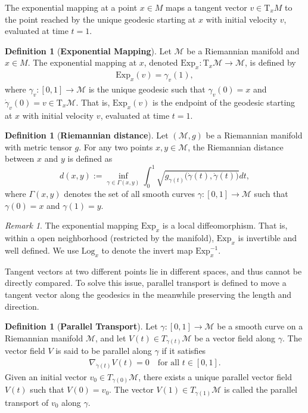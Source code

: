 \documentclass{article}
\theoremstyle{plain}
\theoremstyle{definition}
\newtheorem{definition}[theorem]{Definition}
\theoremstyle{remark}
\newtheorem{remark}[theorem]{Remark}
\begin{document}
The exponential mapping at a point $ x \in M $ maps a tangent vector $ v \in \mathrm{T}_x M $ to the point reached by the unique geodesic starting at $ x $ with initial velocity $ v $, evaluated at time $ t = 1 $. 

\begin{definition}[\bf Exponential Mapping]\label{def:exponential_mapping} 
Let $ \mathcal{M} $ be a Riemannian manifold and $ x \in M $. The exponential mapping at $ x $, denoted $ \mathrm{Exp}_x: \mathrm{T}_x \mathcal{M} \to \mathcal{M} $, is defined by
\begin{align*}
\mathrm{Exp}_x(v) = \gamma_v(1),
\end{align*}
where $ \gamma_v: [0,1] \to \mathcal{M} $ is the unique geodesic such that $ \gamma_v(0) = x $ and $ \dot{\gamma}_v(0) = v \in \mathrm{T}_x \mathcal{M} $. That is, $ \mathrm{Exp}_x(v) $ is the endpoint of the geodesic starting at $ x $ with initial velocity $ v $, evaluated at time $ t = 1 $.
\end{definition}

\begin{definition}[\bf Riemannian distance]
Let $(\mathcal{M}, g)$ be a Riemannian manifold with metric tensor $g$. 
For any two points $x,y \in \mathcal{M}$, the Riemannian distance between $x$ and $y$ is defined as
\[
d(x,y) := \inf_{\gamma \in \Gamma(x,y)} \int_{0}^{1} 
    \sqrt{ g_{\gamma(t)}\bigl(\dot{\gamma}(t), \dot{\gamma}(t)\bigr)}  dt,
\]
where $\Gamma(x,y)$ denotes the set of all smooth curves $\gamma:[0,1]\to \mathcal{M}$ such that $\gamma(0)=x$ and $\gamma(1)=y$. 
\end{definition}


\begin{remark}
The exponential mapping $\mathrm{Exp}_x$ is a local diffeomorphism. That is, within a open neighborhood (restricted by the manifold), $\mathrm{Exp}_x$ is invertible and well defined. We use $\mathrm{Log}_{x}$ to denote the invert map $\mathrm{Exp}_x^{-1}$.
\end{remark}


Tangent vectors at two different points lie in different spaces, and thus cannot be directly compared. To solve this issue, parallel transport is defined to move a tangent vector along the geodesics in the meanwhile preserving the length and direction.
\begin{definition}[\bf Parallel Transport]\label{def:parallel_tranposrt} 
Let $ \gamma: [0,1] \to \mathcal{M} $ be a smooth curve on a Riemannian manifold $ \mathcal{M} $, and let $ V(t) \in T_{\gamma(t)} \mathcal{M} $ be a vector field along $ \gamma $. The vector field $ V $ is said to be parallel along $ \gamma $ if it satisfies
\begin{align*}
\nabla_{\dot{\gamma}(t)} V(t) = 0 \quad \text{for all } t \in [0,1].
\end{align*}
Given an initial vector $ v_0 \in T_{\gamma(0)} \mathcal{M} $, there exists a unique parallel vector field $ V(t) $ such that $ V(0) = v_0 $. The vector $ V(1) \in T_{\gamma(1)} \mathcal{M} $ is called the parallel transport of $ v_0 $ along $ \gamma $.
\end{definition}
\end{document}
